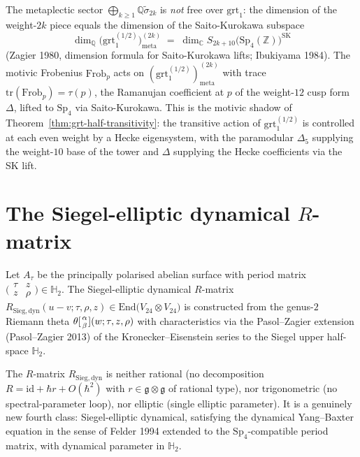 \begin{remark}
\label{rem:siegel-galois-metaplectic}
The metaplectic sector $\bigoplus_{k\geq 1}\mathbb{Q}\widetilde\sigma_{2k}$ is
\emph{not} free over $\mathrm{grt}_1$: the dimension of the weight-$2k$ piece
equals the dimension of the Saito-Kurokawa subspace
\[
 \dim_{\mathbb{Q}}\bigl(\mathrm{grt}_1^{(1/2)}\bigr)^{(2k)}_{\mathrm{meta}}
 \;=\;
 \dim_{\mathbb{C}} S_{2k+10}\bigl(\mathrm{Sp}_4(\mathbb{Z})\bigr)^{\mathrm{SK}}
\]
(Zagier 1980, dimension formula for Saito-Kurokawa lifts; Ibukiyama 1984).
The motivic Frobenius $\mathrm{Frob}_p$ acts on
$(\mathrm{grt}_1^{(1/2)})^{(2k)}_{\mathrm{meta}}$ with trace
$\mathrm{tr}(\mathrm{Frob}_p) = \tau(p)$, the Ramanujan coefficient at $p$ of
the weight-$12$ cusp form $\Delta$, lifted to $\mathrm{Sp}_4$ via Saito-Kurokawa.
This is the motivic shadow of
Theorem~\ref{thm:grt-half-transitivity}: the transitive action of
$\mathrm{grt}_1^{(1/2)}$ is controlled at each even weight by a Hecke
eigensystem, with the paramodular $\Delta_5$ supplying the weight-$10$ base of
the tower and $\Delta$ supplying the Hecke coefficients via the SK lift.
\end{remark}

\section{The Siegel-elliptic dynamical \texorpdfstring{$R$}{R}-matrix}
\label{sec:R-Sieg-dynamical}

\begin{definition}
\label{def:R-Sieg-dynamical}
Let $A_\tau$ be the principally polarised abelian surface with period matrix
$\bigl(\begin{smallmatrix}\tau & z\\ z & \rho\end{smallmatrix}\bigr)\in\mathbb{H}_2$.
The Siegel-elliptic dynamical $R$-matrix
$R_{\mathrm{Sieg,dyn}}(u-v;\tau,\rho,z)\in\mathrm{End}\bigl(V_{24}\otimes V_{24}\bigr)$
is constructed from the genus-$2$ Riemann theta $\theta[{\alpha\atop\beta}](w;\tau,z,\rho)$
with characteristics via the Pasol--Zagier extension (Pasol--Zagier 2013) of the
Kronecker--Eisenstein series to the Siegel upper half-space $\mathbb{H}_2$.
\end{definition}

\begin{theorem}
\label{thm:R-sieg-fourth-class}
The $R$-matrix $R_{\mathrm{Sieg,dyn}}$ is neither rational (no decomposition
$R=\mathrm{id}+\hbar r + O(\hbar^2)$ with $r\in\mathfrak{g}\otimes\mathfrak{g}$ of
rational type), nor trigonometric (no spectral-parameter loop), nor elliptic
(single elliptic parameter). It is a genuinely new fourth class: Siegel-elliptic
dynamical, satisfying the dynamical Yang--Baxter equation in the sense of
Felder 1994 extended to the $\mathrm{Sp}_4$-compatible period matrix, with dynamical
parameter in $\mathbb{H}_2$.
\end{theorem}

